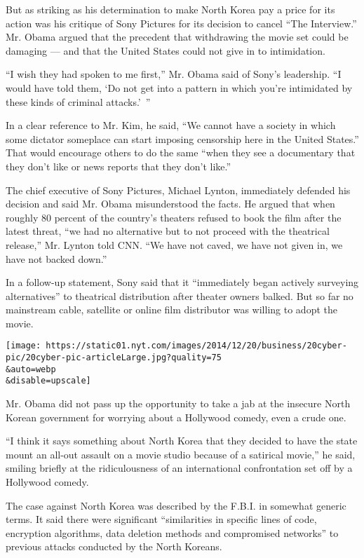 But as striking as his determination to make North Korea pay a price for
its action was his critique of Sony Pictures for its decision to cancel
``The Interview.'' Mr. Obama argued that the precedent that withdrawing
the movie set could be damaging --- and that the United States could not
give in to intimidation.

``I wish they had spoken to me first,'' Mr. Obama said of Sony's
leadership. ``I would have told them, `Do not get into a pattern in
which you're intimidated by these kinds of criminal attacks.'~''

In a clear reference to Mr. Kim, he said, ``We cannot have a society in
which some dictator someplace can start imposing censorship here in the
United States.'' That would encourage others to do the same ``when they
see a documentary that they don't like or news reports that they don't
like.''

The chief executive of Sony Pictures, Michael Lynton, immediately
defended his decision and said Mr. Obama misunderstood the facts. He
argued that when roughly 80 percent of the country's theaters refused to
book the film after the latest threat, ``we had no alternative but to
not proceed with the theatrical release,'' Mr. Lynton told CNN. ``We
have not caved, we have not given in, we have not backed down.''

In a follow-up statement, Sony said that it ``immediately began actively
surveying alternatives'' to theatrical distribution after theater owners
balked. But so far no mainstream cable, satellite or online film
distributor was willing to adopt the movie.

\texttt{[image: https://static01.nyt.com/images/2014/12/20/business/20cyber-pic/20cyber-pic-articleLarge.jpg?quality=75\\\&auto=webp\\\&disable=upscale]}

Mr. Obama did not pass up the opportunity to take a jab at the insecure
North Korean government for worrying about a Hollywood comedy, even a
crude one.

``I think it says something about North Korea that they decided to have
the state mount an all-out assault on a movie studio because of a
satirical movie,'' he said, smiling briefly at the ridiculousness of an
international confrontation set off by a Hollywood comedy.

The case against North Korea was described by the F.B.I. in somewhat
generic terms. It said there were significant ``similarities in specific
lines of code, encryption algorithms, data deletion methods and
compromised networks'' to previous attacks conducted by the North
Koreans.

